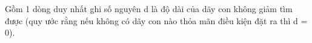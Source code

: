 Gồm 1 dòng duy nhất ghi số nguyên d là độ dài của dãy con không giảm tìm được (quy ước rằng nếu không có dãy con nào thỏa mãn điều kiện đặt ra thì d = 0).